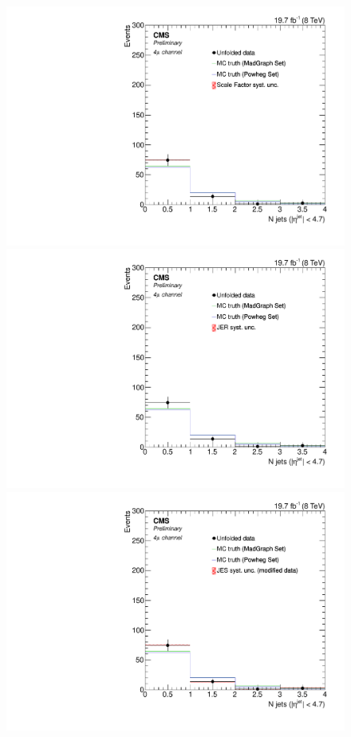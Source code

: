 \begin{figure}[hbtp]
\begin{center}
    \includegraphics[width=0.8\cmsFigWidth]{Figures/Unfolding/Systematics/ZZTo4m_Jets_SFSq_Mad_fr}                    
    \includegraphics[width=0.8\cmsFigWidth]{Figures/Unfolding/Systematics/ZZTo4m_Jets_JER_Mad_fr}
    \includegraphics[width=0.8\cmsFigWidth]{Figures/Unfolding/Systematics/ZZTo4m_Jets_JES_ModData_Mad_fr}     

\end{center}
\end{figure}
